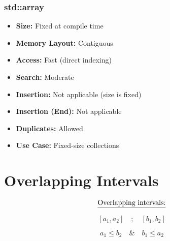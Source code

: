 \subsubsection{std::array}
\begin{itemize}[leftmargin=1.5cm]
    \item \textbf{Size:} Fixed at compile time
    \item \textbf{Memory Layout:} Contiguous
    \item \textbf{Access:} Fast (direct indexing)
    \item \textbf{Search:} Moderate
    \item \textbf{Insertion:} Not applicable (size is fixed)
    \item \textbf{Insertion (End):} Not applicable
    \item \textbf{Duplicates:} Allowed
    \item \textbf{Use Case:} Fixed-size collections
\end{itemize}









\section{Overlapping Intervals}

\[
\text{\underline{Overlapping intervals:}}
\]

\[
[a_1, a_2] \quad ; \quad [b_1, b_2]
\]

\[
a_1 \leq b_2 \quad \& \quad b_1 \leq a_2
\]

